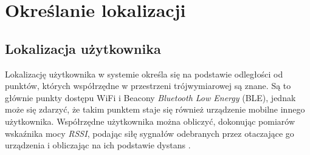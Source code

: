 \chapter{Określanie lokalizacji}
\label{cha:lokalizacja}
\section{Lokalizacja użytkownika}
Lokalizację użytkownika w systemie określa się na podstawie odległości od punktów, których współrzędne w przestrzeni trójwymiarowej są znane. Są to głównie punkty dostępu WiFi i Beacony \textit{Bluetooth Low Energy} (BLE), jednak może się zdarzyć, że takim punktem staje się również urządzenie mobilne innego użytkownika. Współrzędne użytkownika można obliczyć, dokonując pomiarów wskaźnika mocy \textit{RSSI}, podając siłę sygnałów odebranych przez otaczające go urządzenia i obliczając na ich podstawie dystans \cite{RSC}.
